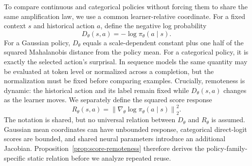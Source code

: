 To compare continuous and categorical policies without forcing them to share the same amplification law, we use a common learner-relative coordinate. For a fixed context $s$ and historical action $a$, define the negative log probability
\begin{equation}
D_\theta(s,a)=-\log\pi_\theta(a\mid s).
\label{eq:remoteness}
\end{equation}
For a Gaussian policy, $D_\theta$ equals a scale-dependent constant plus one half of the squared Mahalanobis distance from the policy mean. For a categorical policy, it is exactly the selected action's surprisal. In sequence models the same quantity may be evaluated at token level or normalized across a completion, but the normalization must be fixed before comparing examples. Crucially, remoteness is dynamic: the historical action and its label remain fixed while $D_\theta(s,a)$ changes as the learner moves. We separately define the squared score response
\begin{equation}
R_\theta(s,a)=\left\|\nabla_\theta\log\pi_\theta(a\mid s)\right\|_2^2.
\label{eq:score-response}
\end{equation}
The notation is shared, but no universal relation between $D_\theta$ and $R_\theta$ is assumed. Gaussian mean coordinates can have unbounded response, categorical direct-logit scores are bounded, and shared neural parameters introduce an additional Jacobian. Proposition~\ref{prop:score-remoteness} therefore derives the policy-family-specific static relation before we analyze repeated reuse.
